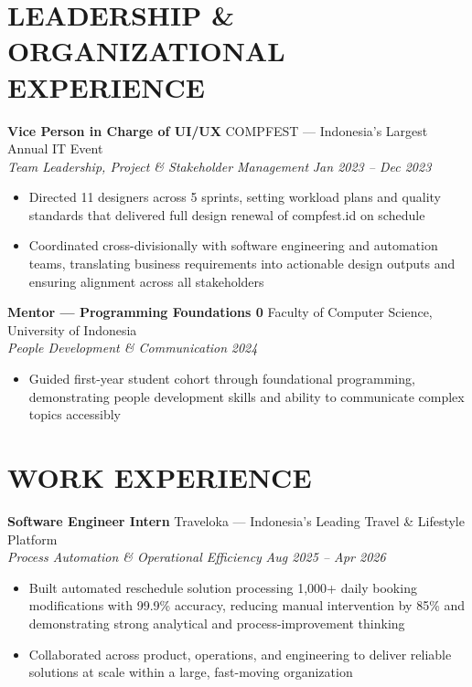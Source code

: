 \documentclass[10pt,a4paper]{article}
\newcommand{\experienceheader}[4]{
    \textbf{#1} \hfill #2 \\
    \textit{#3} \hfill \textit{#4}
}
\begin{document}
\vspace{-5pt}

\section*{LEADERSHIP \& ORGANIZATIONAL EXPERIENCE}

\experienceheader{Vice Person in Charge of UI/UX}{COMPFEST --- Indonesia's Largest Annual IT Event}{Team Leadership, Project \& Stakeholder Management}{Jan 2023 -- Dec 2023}
\begin{itemize}[leftmargin=*, itemsep=0pt, topsep=1pt]
    \item Directed 11 designers across 5 sprints, setting workload plans and quality standards that delivered full design renewal of compfest.id on schedule
    \item Coordinated cross-divisionally with software engineering and automation teams, translating business requirements into actionable design outputs and ensuring alignment across all stakeholders
\end{itemize}

\vspace{1pt}
\experienceheader{Mentor --- Programming Foundations 0}{Faculty of Computer Science, University of Indonesia}{People Development \& Communication}{2024}
\begin{itemize}[leftmargin=*, itemsep=0pt, topsep=1pt]
    \item Guided first-year student cohort through foundational programming, demonstrating people development skills and ability to communicate complex topics accessibly
\end{itemize}

\vspace{-5pt}

\section*{WORK EXPERIENCE}

\experienceheader{Software Engineer Intern}{Traveloka --- Indonesia's Leading Travel \& Lifestyle Platform}{Process Automation \& Operational Efficiency}{Aug 2025 -- Apr 2026}
\begin{itemize}[leftmargin=*, itemsep=0pt, topsep=1pt]
    \item Built automated reschedule solution processing 1,000+ daily booking modifications with 99.9\% accuracy, reducing manual intervention by 85\% and demonstrating strong analytical and process-improvement thinking
    \item Collaborated across product, operations, and engineering to deliver reliable solutions at scale within a large, fast-moving organization
\end{itemize}
\end{document}
